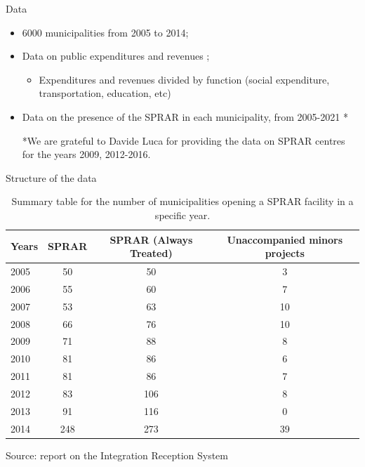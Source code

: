 \documentclass[xcolor={dvipsnames}]{beamer}
\begin{document}
\begin{frame}{Data}
\begin{itemize}
\justifying
\item 6000 municipalities from 2005 to 2014; \\
\vspace{5}

\item Data on public expenditures and revenues \citep{openpolis2024}; \\
\begin{itemize}
\justifying
    \item Expenditures and revenues divided by function (social expenditure, transportation, education, etc) \\ 
    \vspace{5}
\end{itemize}

\item Data on the presence of the SPRAR in each municipality, from 2005-2021 \citep{proietti2022, cittalia2022}* \\

\vspace{20}
\fontsize{7.2}{7.2}\selectfont

*We are grateful to Davide Luca for providing the data on SPRAR centres for the years 2009, 2012-2016.

\end{itemize}
\end{frame}

\begin{frame}{Structure of the data}
\fontsize{7.2}{7.2}\selectfont
\begin{table}[h]
    \centering
        \caption{Summary table for the number of municipalities opening a SPRAR facility in a specific year.}
    \begin{tabular}{lccc}
    \hline 
\textbf{Years} & SPRAR & SPRAR (Always Treated) & Unaccompanied minors projects
\\ 
\hline
2005&50&50&3 \\
2006&55&60&7 \\
2007&53&63&10 \\
2008&66&76&10 \\
2009&71&88&8 \\
2010&81&86&6 \\
2011&81&86&7 \\
2012&83&106&8 \\
2013&91&116&0 \\
2014&248&273&39 \\
\hline
    \end{tabular}
    \label{tab2}
\end{table}

\fontsize{6}{7.2}\selectfont
Source: report on the Integration Reception System \citep{cittalia2022}
    
\end{frame}
\end{document}

